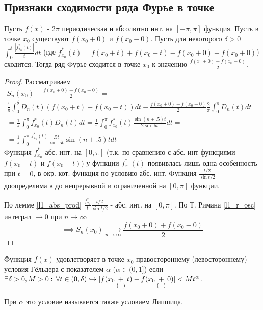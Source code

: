 \documentclass{article}
\begin{document}
\subsection{Признаки сходимости ряда Фурье в точке}
\begin{theorem}
  Пусть $f(x)$ - $2\pi$ периодическая и абсолютно инт. на $[-\pi,\pi]$ функция.
  Пусть  в точке $x_0$ существуют $f(x_0+0)$ и $f(x_0-0)$.
  Пусть для некоторого $\delta>0$ $\int_{0}^{\delta}\frac{|f^*_{x_0}(t)|}{t}dt$
  (где $f^*_{x_0}(t)=f(x_0+t)+f(x_0-t)-f(x_0+0)-f(x_0+0)$) сходится.
  Тогда ряд Фурье сходится в точке $x_0$ к значению $\frac{f(x_0+0)+f(x_0-0)}{2}$.
\end{theorem}
\begin{proof}
  Рассматриваем
  \begin{gather*}
    S_n(x_{0})-\frac{f(x_0+0)+f(x_0-0)}{2}= \\
     \frac{1}{\pi}\int_{0}^{\delta}D_n(t)(f(x_0+t)+f(x_0-t))dt-\frac{f(x_0+0)+f(x_0-0)}{2}\frac{2}{\pi}\int_{0}^{\pi}D_n(t)dt = \\ 
    = \frac{1}{\pi}\int_{0}^{\pi}f^*_{x_0}(t)D_n(t)dt=\frac{1}{\pi}\int_{0}^{\pi}f^*_{x_0}(t)\frac{\sin(n+.5)t}{2\sin.5t}dt = \\
    = \frac{1}{\pi}\int_{0}^{\pi}\frac{f^*_{x_0}(t)}{t}\frac{.5t}{\sin .5t}\sin(n+.5)t dt
  \end{gather*}
  Функция $f^{*}_{x_0}$ абс. инт. на $[0,\pi]$ (т.к. по сравнению с абс. инт функциями
  $f(x_0+t)$ и $f(x_0-t)$) у функции $f^{*}_{x_0}(t)$ появивлась лишь одна
  особенность при $t=0$, в окр. кот. функция по условию абс. инт.
  Функция $\frac{t/2}{\sin t/2}$ доопределима в до непрерывной и ограниченной на
  $[0,\pi]$ функции.

  По лемме \ref{l1_abs_prod} 
  $\frac{f_{x_0}^{*}}{t}\frac{t/2}{\sin t/2}$ - абс. инт. на $[0,\pi]$.
  По Т. Римана \ref{l1_r_osc} 
  интеграл $\to 0$ при $n \to \infty$
  \[
    \implies S_n(x_0) \underset{n\to\infty}{\to}\frac{f(x_0+0)+f(x_0-0)}{2}
  \]
\end{proof}
\begin{definition}
  Функция $f(x)$ удовлетворяет в точке $x_0$ правостороннему (левостороннему)
  условия Гёльдера с показателем $\alpha$ ($\alpha \in (0,1]$)
  если $\exists \delta>0, M>0 :\, \forall t\in(0,\delta) \hookrightarrow |f(x_0\underset{(-)}{+}t)-f(x_0\underset{(-)}{+}0)|<Mt^{\alpha}$.
\end{definition}
\begin{remark}
  При $\alpha$ это условие называется также условием Липшица.
\end{remark}
\end{document}

